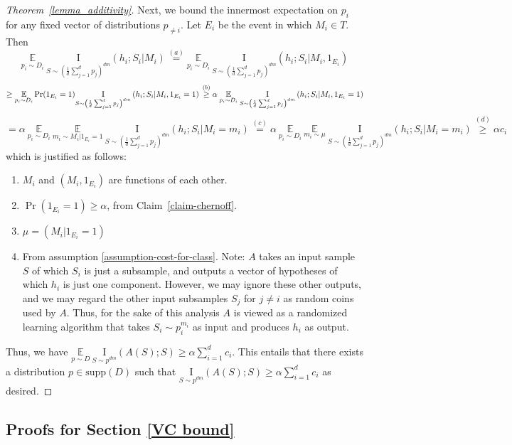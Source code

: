 \documentclass[final,12pt]{colt2018}
\newcommand{\EE}[1]{\underset{#1}{\mathbb{E}}}
\newcommand{\I}[2]{\underset{#1}{\mathrm{I}}\left(#2\right)}
\newcommand{\supp}{\mathrm{supp}}
\begin{document}
\begin{proof}[Theorem~\ref{lemma_additivity}]
	Next, we bound the innermost expectation on $p_i$ for any fixed vector of distributions $p_{\neq i}$. Let $E_i$ be the event in which $M_i \in T$. Then
	$$
	\EE{p_i \sim D_i} \: \I{S \sim \left(\frac{1}{d}\sum_{j=1}^d p_j \right)^{dm}}{h_i;S_i|M_i}  \stackrel{(a)}{=} \EE{p_i \sim D_i} \: \I{S \sim \left(\frac{1}{d}\sum_{j=1}^d p_j \right)^{dm}}{h_i;S_i|M_i,1_{E_i}}  $$
	$$ \geq \EE{p_i \sim D_i} \Pr(1_{E_i}=1) \I{S \sim \left(\frac{1}{d}\sum_{j=1}^d p_j \right)^{dm}}{h_i;S_i|M_i,1_{E_i}=1} \\
	 \stackrel{(b)}{\geq} \alpha \:  \EE{p_i \sim D_i} \: \I{S \sim \left(\frac{1}{d}\sum_{j=1}^d p_j \right)^{dm}}{h_i;S_i|M_i,1_{E_i}=1} $$
$$	 = \alpha \: \EE{p_i \sim D_i} \: \EE{m_i \sim M_i|1_{E_i}=1} \: \I{S \sim \left(\frac{1}{d}\sum_{j=1}^d p_j \right)^{dm}}{h_i;S_i|M_i=m_i} 
	 \stackrel{(c)}{=} \alpha \: \EE{p_i \sim D_i} \: \EE{m_i \sim \mu} \: \I{S \sim \left(\frac{1}{d}\sum_{j=1}^d p_j \right)^{dm}}{h_i;S_i|M_i=m_i} 
	 \stackrel{(d)}{\geq} \alpha c_i
$$
	which is justified as follows:
	\begin{enumerate}[label=(\alph*)]
		\item{$M_i$ and $(M_i,1_{E_i})$ are functions of each other.}
		\item{$\Pr(1_{E_i}=1)\geq\alpha$, from Claim~\ref{claim-chernoff}.}
		\item{$\mu = (M_i|1_{E_i}=1)$}
		\item{From assumption \ref{assumption-cost-for-class}. Note: $A$ takes an input sample $S$ of which $S_i$ is just a subsample, and outputs a vector of hypotheses of which $h_i$ is just one component. However, we may ignore these other outputs, and we may regard the other input subsamples $S_j$ for $j\neq i$ as random coins used by $A$. Thus, for the sake of this analysis $A$ is viewed as a randomized learning algorithm that takes $S_i\sim p_i^{m_i}$ as input and produces $h_i$ as output.}
	\end{enumerate}
	
	Thus, we have
	$
	\EE{p \sim D} \: \I{S \sim p^{dm}}{A(S);S} \geq \alpha \sum_{i=1}^d c_i
	$. This entails that there exists a distribution $p\in\supp(D)$ such that
	$
	\I{S \sim p^{dm}}{A(S);S} \geq \alpha \sum_{i=1}^d c_i
	$
	as desired.
\end{proof}
\subsection{Proofs for Section \ref{VC bound}}
\end{document}
